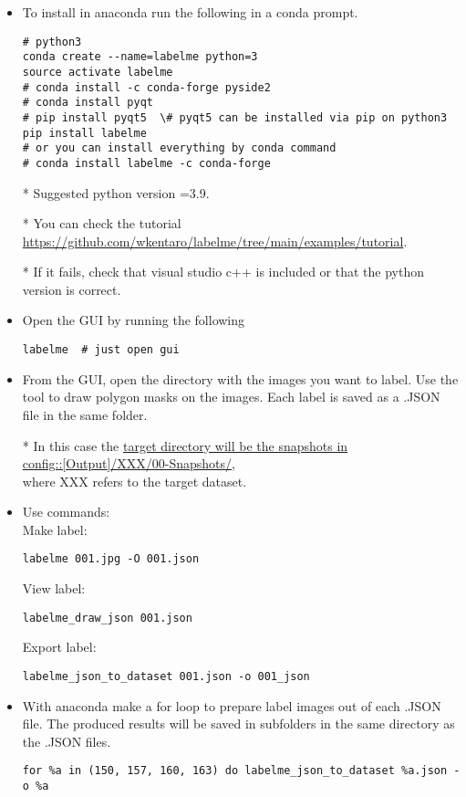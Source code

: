 \documentclass{foxelas_report}
\begin{document}
\begin{enumerate}
\begin{itemize}
\item To install in anaconda run the following in a conda prompt.\\

\begin{lstlisting}
# python3
conda create --name=labelme python=3
source activate labelme
# conda install -c conda-forge pyside2
# conda install pyqt
# pip install pyqt5  \# pyqt5 can be installed via pip on python3
pip install labelme
# or you can install everything by conda command
# conda install labelme -c conda-forge
\end{lstlisting}



* Suggested python version =3.9. 

* You can check the tutorial \url{https://github.com/wkentaro/labelme/tree/main/examples/tutorial}.

* If it fails, check that visual studio c++ is included or that the python version is correct. 


\item Open the GUI by running the following \\
\begin{lstlisting}
labelme  # just open gui
\end{lstlisting}

\item From the GUI, open the directory with the images you want to label. Use the tool to draw polygon masks on the images. Each label is saved as a .JSON file in the same folder. 

* In this case the \underline{target directory will be the snapshots in}\\
\underline{config::[Output]/XXX/00-Snapshots/},\\ where XXX refers to the target dataset.

\item Use commands: \\
Make label: 
\begin{lstlisting}
labelme 001.jpg -O 001.json 
\end{lstlisting}

View label: 
\begin{lstlisting}
labelme_draw_json 001.json
\end{lstlisting}

Export label:
\begin{lstlisting}
labelme_json_to_dataset 001.json -o 001_json
\end{lstlisting}


\item With anaconda make a for loop to prepare label images out of each .JSON file. The produced results will be saved in subfolders in the same directory as the .JSON files. 

\begin{lstlisting}
for %a in (150, 157, 160, 163) do labelme_json_to_dataset %a.json -o %a
\end{lstlisting}



\end{itemize}

\end{enumerate}
\end{document}
